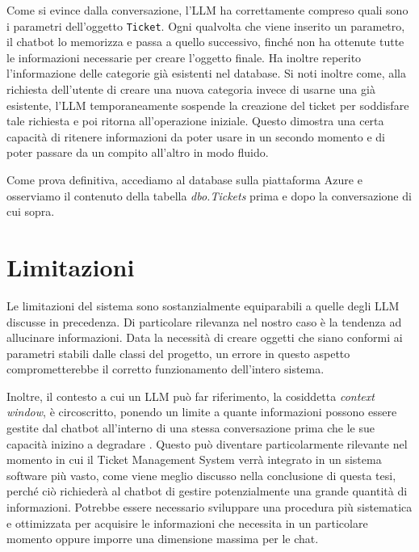 Come si evince dalla conversazione, l'LLM ha correttamente compreso quali sono i parametri dell'oggetto \texttt{Ticket}. Ogni qualvolta che viene
inserito un parametro, il chatbot lo memorizza e passa a quello successivo, finché non ha ottenute tutte le informazioni necessarie per creare l'oggetto finale.
Ha inoltre reperito l'informazione delle categorie già esistenti nel database. Si noti inoltre come, alla richiesta dell'utente di creare una nuova categoria invece di usarne una
già esistente, l'LLM temporaneamente sospende la creazione del ticket per soddisfare tale richiesta e poi ritorna all'operazione iniziale. Questo dimostra una certa capacità
di ritenere informazioni da poter usare in un secondo momento e di poter passare da un compito all'altro in modo fluido.

\newpage
Come prova definitiva, accediamo al database sulla piattaforma Azure e osserviamo il contenuto della tabella \textit{dbo.Tickets} prima e dopo la conversazione di cui sopra.



\newpage
\section{Limitazioni}
Le limitazioni del sistema sono sostanzialmente equiparabili a quelle degli LLM discusse in precedenza. Di particolare rilevanza nel nostro caso è la tendenza ad allucinare informazioni.
Data la necessità di creare oggetti che siano conformi ai parametri stabili dalle classi del progetto, un errore in questo aspetto comprometterebbe il corretto funzionamento dell'intero sistema.

Inoltre, il contesto a cui un LLM può far riferimento, la cosiddetta \textit{context window}, è circoscritto, ponendo un limite a quante informazioni possono essere gestite dal chatbot
all'interno di una stessa conversazione prima che le sue capacità inizino a degradare \cite{ibm_context_window}. Questo può diventare particolarmente rilevante nel momento in cui il Ticket Management System verrà
integrato in un sistema software più vasto, come viene meglio discusso nella conclusione di questa tesi, perché ciò richiederà al chatbot di gestire potenzialmente una grande quantità di informazioni.
Potrebbe essere necessario sviluppare una procedura più sistematica e ottimizzata per acquisire le informazioni che necessita in un particolare momento oppure imporre
una dimensione massima per le chat.